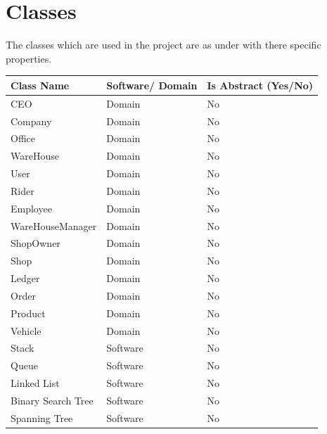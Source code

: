 \documentclass[12pt,a4paper]{report}
\begin{document}
\chapter {Classes}
The classes which are used in the project are as under with there specific properties. 
\begin{center}
\begin{tabular}{ | m{4cm}|m{4cm}|m{4cm}|} 
 \hline

\textbf {Class Name} & \textbf{ Software/ Domain }&\textbf {Is Abstract (Yes/No)}\\ \hline
 CEO 		&Domain			&No\\ \hline
 Company		&Domain			&No\\ \hline
 Office		&Domain			&No\\ \hline
 WareHouse	&Domain			&No\\ \hline
 User		&Domain			&No\\ \hline
 Rider		&Domain			&No\\ \hline
 Employee  	&Domain			&No\\ \hline
 WareHouseManager&Domain		&No\\ \hline
 ShopOwner 	&Domain			&No\\ \hline
 Shop	  	&Domain			&No\\ \hline
 Ledger	  	&Domain			&No\\ \hline
 Order		&Domain			&No\\ \hline
 Product		&Domain			&No\\ \hline
 Vehicle		&Domain			&No\\ \hline
 Stack		&Software		&No\\ \hline
 Queue		&Software		&No\\ \hline
 Linked List	&Software		&No\\ \hline
 Binary Search Tree&Software	&No\\ \hline
 Spanning Tree  &Software		&No\\  \hline
\end{tabular}
\end{center}
\end{document}
